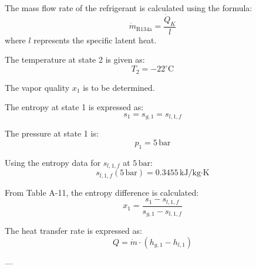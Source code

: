 The mass flow rate of the refrigerant is calculated using the formula:  
\[
\dot{m}_{\text{R134a}} = \frac{\dot{Q}_K}{l}
\]  
where \( l \) represents the specific latent heat.  

The temperature at state 2 is given as:  
\[
T_2 = -22^\circ\text{C}
\]  

The vapor quality \( x_1 \) is to be determined.  

The entropy at state 1 is expressed as:  
\[
s_1 = s_{g,1} = s_{l,1,f}
\]  

The pressure at state 1 is:  
\[
p_1 = 5 \, \text{bar}
\]  

Using the entropy data for \( s_{l,1,f} \) at \( 5 \, \text{bar} \):  
\[
s_{l,1,f}(5 \, \text{bar}) = 0.3455 \, \text{kJ/kg·K}
\]  

From Table A-11, the entropy difference is calculated:  
\[
x_1 = \frac{s_1 - s_{l,1,f}}{s_{g,1} - s_{l,1,f}}
\]  

The heat transfer rate is expressed as:  
\[
Q = \dot{m} \cdot (h_{g,1} - h_{l,1})
\]  

---
